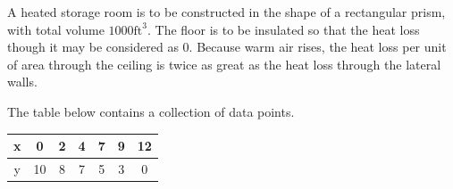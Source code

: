 \documentclass[11pt]{exam}
\begin{document}
%
%
%

\begin{questions}


\addpoints
\question A heated storage room is to be constructed in the shape of a rectangular prism, with total volume $1000 \mathrm{ft}^3$. The floor is to be insulated so that the heat loss though it may be considered as $0$. Because warm air rises, the heat loss per unit of area through the ceiling is twice as great as the heat loss through the lateral walls.

\newpage 


\addpoints 
\question The table below contains a collection of data points.
\begin{center}
\begin{tabular}{|c|c|c|c|c|c|c|}
\hline 
x & 0 & 2 & 4 & 7 & 9 & 12\\ 
\hline 
y & 10 & 8 & 7 & 5 & 3 & 0\\ 
\hline 
\end{tabular} 
\end{center}


\end{questions}
\end{document}

